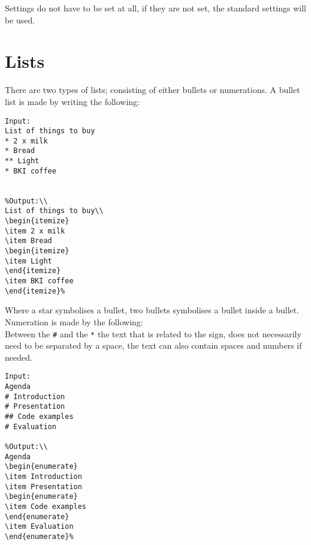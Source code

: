 Settings do not have to be set at all, if they are not set, the standard settings will be used.

\section{Lists}
There are two types of lists; consisting of either bullets or numerations.
A bullet list is made by writing the following: \\

\begin{lstlisting}[frame=single]
Input:
List of things to buy
* 2 x milk
* Bread
** Light
* BKI coffee

 
%Output:\\
List of things to buy\\
\begin{itemize}
\item 2 x milk
\item Bread
\begin{itemize}
\item Light
\end{itemize}
\item BKI coffee
\end{itemize}%
\end{lstlisting}

Where a star symbolises a bullet, two bullets symbolises a bullet inside a bullet.
Numeration is made by the following: \\
Between the \texttt{\#} and the \texttt{*} the text that is related to the sign, does not necessarily need to be separated by a space, the text can also contain spaces and numbers if needed.\\

\begin{lstlisting}[frame=single]
Input:
Agenda
# Introduction
# Presentation
## Code examples
# Evaluation

%Output:\\
Agenda
\begin{enumerate}
\item Introduction
\item Presentation
\begin{enumerate}
\item Code examples
\end{enumerate}
\item Evaluation
\end{enumerate}%
\end{lstlisting}

